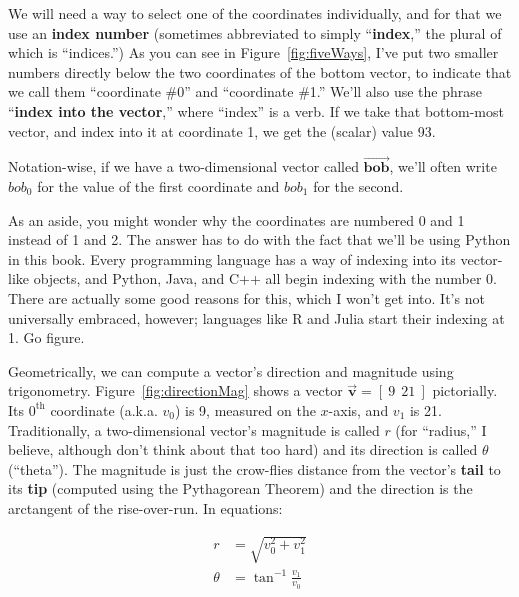 
We will need a way to select one of the coordinates individually, and for that
we use an \textbf{index number} (sometimes abbreviated to simply
``\textbf{index},'' the plural of which is ``indices.'') As you can see in
Figure~\ref{fig:fiveWays}, I've put two smaller numbers directly below the two
coordinates of the bottom vector, to indicate that we call them ``coordinate
\#0'' and ``coordinate \#1.'' We'll also use the phrase ``\textbf{index into
the vector},'' where ``index'' is a verb. If we take that bottom-most vector,
and index into it at coordinate 1, we get the (scalar) value 93.

Notation-wise, if we have a two-dimensional vector called
$\overrightarrow{\textbf{bob}}$, we'll often write $bob_0$ for the value of the
first coordinate and $bob_1$ for the second.

\label{PythonStartsAtZero}

As an aside, you might wonder why the coordinates are numbered 0 and 1 instead
of 1 and 2. The answer has to do with the fact that we'll be using Python in
this book. Every programming language has a way of indexing into its
vector-like objects, and Python, Java, and C++ all begin indexing with the
number 0. There are actually some good reasons for this, which I won't get
into. It's not universally embraced, however; languages like R and Julia start
their indexing at 1. Go figure.


Geometrically, we can compute a vector's direction and magnitude using
trigonometry. Figure~\ref{fig:directionMag} shows a vector
$\overrightarrow{\textbf{v}} = [\ 9 \ \ 21\ ]$ pictorially. Its $0^\text{th}$
coordinate (a.k.a. $v_0$) is 9, measured on the $x$-axis, and $v_1$ is 21.
Traditionally, a two-dimensional vector's magnitude is called $r$ (for
``radius,'' I believe, although don't think about that too hard) and its
direction is called $\theta$ (``theta''). The magnitude is just the crow-flies
distance from the vector's \textbf{tail} to its \textbf{tip} (computed using
the Pythagorean Theorem) and the direction is the arctangent of the
rise-over-run. In equations:

\vspace{-.25in}
\begin{align*}
r &= \sqrt{v_0^2 + v_1^2} \\
\theta &= \tan^{-1} \frac{v_1}{v_0} \\
\end{align*}
\vspace{-.55in}

